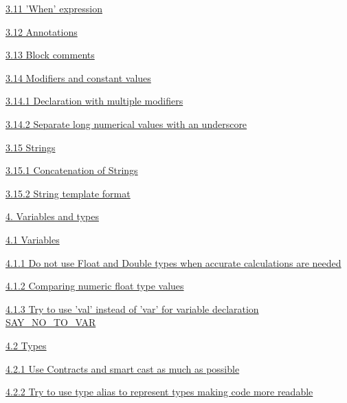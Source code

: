 \hspace{0.5cm}\hyperref[sec:3.11]{ 3.11 'When' expression}

\hspace{0.5cm}\hyperref[sec:3.12]{ 3.12 Annotations}

\hspace{0.5cm}\hyperref[sec:3.13]{ 3.13 Block comments}

\hspace{0.5cm}\hyperref[sec:3.14]{ 3.14 Modifiers and constant values}

\hspace{1.0cm}\hyperref[sec:3.14.1]{ 3.14.1 Declaration with multiple modifiers}

\hspace{1.0cm}\hyperref[sec:3.14.2]{ 3.14.2 Separate long numerical values with an underscore}

\hspace{1.0cm}\hyperref[sec:3.15]{ 3.15 Strings}

\hspace{1.0cm}\hyperref[sec:3.15.1]{ 3.15.1 Concatenation of Strings}

\hspace{1.0cm}\hyperref[sec:3.15.2]{ 3.15.2 String template format}

\hspace{0.0cm}\hyperref[sec:]{}

\hspace{0.0cm}\hyperref[sec:4.]{4. Variables and types}

\hspace{0.5cm}\hyperref[sec:4.1]{ 4.1 Variables}

\hspace{1.0cm}\hyperref[sec:4.1.1]{ 4.1.1 Do not use Float and Double types when accurate calculations are needed}

\hspace{1.0cm}\hyperref[sec:4.1.2]{ 4.1.2 Comparing numeric float type values}

\hspace{1.0cm}\hyperref[sec:4.1.3]{ 4.1.3 Try to use 'val' instead of 'var' for variable declaration SAY\_NO\_TO\_VAR}

\hspace{0.5cm}\hyperref[sec:4.2]{ 4.2 Types}

\hspace{1.0cm}\hyperref[sec:4.2.1]{ 4.2.1 Use Contracts and smart cast as much as possible}

\hspace{1.0cm}\hyperref[sec:4.2.2]{ 4.2.2 Try to use type alias to represent types making code more readable}

